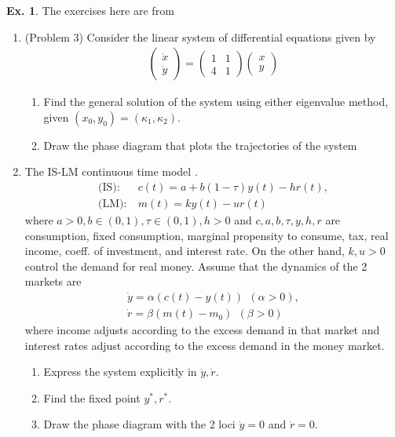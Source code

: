 \documentclass[11pt,a4paper]{book}
\theoremstyle{definition}\newtheorem{definition}{Definition}
\theoremstyle{definition}\newtheorem{fact}{Fact}
\theoremstyle{definition}\newtheorem{remark}{Remark}
\theoremstyle{definition}\newtheorem{ex}{Ex.}
\theoremstyle{definition}\newtheorem{project}{Project}
\theoremstyle{definition}\newtheorem{problem}{Problem}
\theoremstyle{definition}\newtheorem{example}{Example}
\numberwithin{theorem}{section}
\numberwithin{corollary}{chapter}
\numberwithin{assumption}{chapter}
\numberwithin{definition}{chapter}
\numberwithin{prop}{chapter}
\numberwithin{notation}{chapter}
\numberwithin{problem}{chapter}
\numberwithin{example}{chapter}
\numberwithin{fact}{chapter}
\numberwithin{ex}{chapter}
\begin{document}
	\begin{ex}
		The exercises here are from \citet{michaillat2023, shone2002economic}
		\begin{enumerate}[label*=(\alph*)]
			\item (Problem 3) Consider the linear system of differential equations given by
			\begin{align*}
				\begin{pmatrix}
					\dot{x} \\ \dot{y}
				\end{pmatrix}
				=
				\begin{pmatrix}
					1 & 1 \\ 4 & 1
				\end{pmatrix}
				\begin{pmatrix}
					x \\ y
				\end{pmatrix}
			\end{align*}
			\begin{enumerate}[label=\arabic*.]
				\item Find the general solution of the system using either eigenvalue method, given $(x_0, y_0) = (\kappa_1, \kappa_2)$.
				\item Draw the phase diagram that plots the trajectories of the system
			\end{enumerate}
			\item The IS-LM continuous time model \citep[p.10.3]{shone2002economic}.
			\begin{align*}
				\text{(IS)}: & \ c(t) = a + b(1 - \tau) y(t) - h r(t), \\
				\text{(LM)}: & \ m(t) = k y(t) - u r(t)
			\end{align*}
			where $a > 0, b \in (0,1), \tau \in (0,1), h > 0$ and $c, a, b, \tau, y, h, r$ are consumption, fixed consumption, marginal propensity to consume, tax, real income, coeff. of investment, and interest rate. On the other hand, $k, u > 0$ control the demand for real money. Assume that the dynamics of the 2 markets are
			\begin{align*}
				\dot{y} = \alpha (c(t) - y(t)) \ \ (\alpha > 0), \\
				\dot{r} = \beta (m(t) - m_0) \ \ (\beta > 0)
			\end{align*}
			where income adjusts according to the excess demand in that market and interest rates adjust according to the excess demand in the money market.
			\begin{enumerate}[label=\arabic*.]
				\item Express the system explicitly in $\dot{y}, \dot{r}$.
				\item Find the fixed point $y^*, r^*$.
				\item Draw the phase diagram with the 2 loci $\dot{y} = 0$ and $\dot{r}=0$.
			\end{enumerate}
		\end{enumerate}
	\end{ex}	
	
\end{document}
